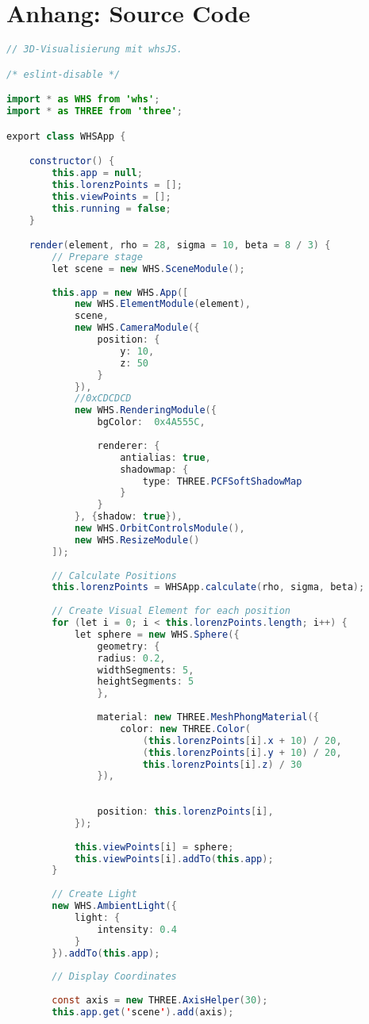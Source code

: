 
\section{Anhang: Source Code}

\begin{lstlisting}[style=C, language=Java, caption=App.js]
// 3D-Visualisierung mit whsJS.

/* eslint-disable */

import * as WHS from 'whs';
import * as THREE from 'three';

export class WHSApp {

	constructor() {
		this.app = null;
		this.lorenzPoints = [];
		this.viewPoints = [];
		this.running = false;
	}

	render(element, rho = 28, sigma = 10, beta = 8 / 3) {
		// Prepare stage
		let scene = new WHS.SceneModule();
		
		this.app = new WHS.App([
			new WHS.ElementModule(element),
			scene,
			new WHS.CameraModule({
				position: {
					y: 10,
					z: 50
				}
			}),
			//0xCDCDCD
			new WHS.RenderingModule({
				bgColor:  0x4A555C,
				
				renderer: {
					antialias: true,
					shadowmap: {
						type: THREE.PCFSoftShadowMap
					}
				}
			}, {shadow: true}),
			new WHS.OrbitControlsModule(),
			new WHS.ResizeModule()
		]);
		
		// Calculate Positions
		this.lorenzPoints = WHSApp.calculate(rho, sigma, beta);
		
		// Create Visual Element for each position
		for (let i = 0; i < this.lorenzPoints.length; i++) {
			let sphere = new WHS.Sphere({
				geometry: {
				radius: 0.2,
				widthSegments: 5,
				heightSegments: 5
				},
				
				material: new THREE.MeshPhongMaterial({
					color: new THREE.Color(
						(this.lorenzPoints[i].x + 10) / 20, 
						(this.lorenzPoints[i].y + 10) / 20, 
						this.lorenzPoints[i].z) / 30
				}),
				
				
				position: this.lorenzPoints[i],
			});
			
			this.viewPoints[i] = sphere;
			this.viewPoints[i].addTo(this.app);
		}
		
		// Create Light
		new WHS.AmbientLight({
			light: {
				intensity: 0.4
			}
		}).addTo(this.app);
		
		// Display Coordinates
		
		const axis = new THREE.AxisHelper(30);
		this.app.get('scene').add(axis);
		

\end{lstlisting}
